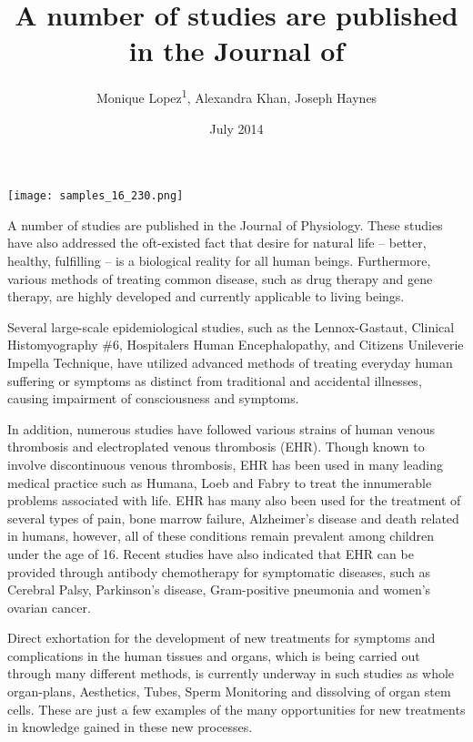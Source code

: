 \documentclass{article}
\title{A number of studies are published in the Journal of}
\author{Monique Lopez\textsuperscript{1},  Alexandra Khan,  Joseph Haynes}
\affil{\textsuperscript{1}Ewha Womans University}
\date{July 2014}
\begin{document}
\maketitle

\begin{center}
\begin{minipage}{0.75\linewidth}
\texttt{[image: samples\_16\_230.png]}
\end{minipage}
\end{center}

A number of studies are published in the Journal of Physiology. These studies have also addressed the oft-existed fact that desire for natural life -- better, healthy, fulfilling -- is a biological reality for all human beings. Furthermore, various methods of treating common disease, such as drug therapy and gene therapy, are highly developed and currently applicable to living beings.

Several large-scale epidemiological studies, such as the Lennox-Gastaut, Clinical Histomyography \#6, Hospitalers Human Encephalopathy, and Citizens Unileverie Impella Technique, have utilized advanced methods of treating everyday human suffering or symptoms as distinct from traditional and accidental illnesses, causing impairment of consciousness and symptoms.

In addition, numerous studies have followed various strains of human venous thrombosis and electroplated venous thrombosis (EHR). Though known to involve discontinuous venous thrombosis, EHR has been used in many leading medical practice such as Humana, Loeb and Fabry to treat the innumerable problems associated with life. EHR has many also been used for the treatment of several types of pain, bone marrow failure, Alzheimer's disease and death related in humans, however, all of these conditions remain prevalent among children under the age of 16. Recent studies have also indicated that EHR can be provided through antibody chemotherapy for symptomatic diseases, such as Cerebral Palsy, Parkinson's disease, Gram-positive pneumonia and women's ovarian cancer.

Direct exhortation for the development of new treatments for symptoms and complications in the human tissues and organs, which is being carried out through many different methods, is currently underway in such studies as whole organ-plans, Aesthetics, Tubes, Sperm Monitoring and dissolving of organ stem cells. These are just a few examples of the many opportunities for new treatments in knowledge gained in these new processes.
\end{document}
